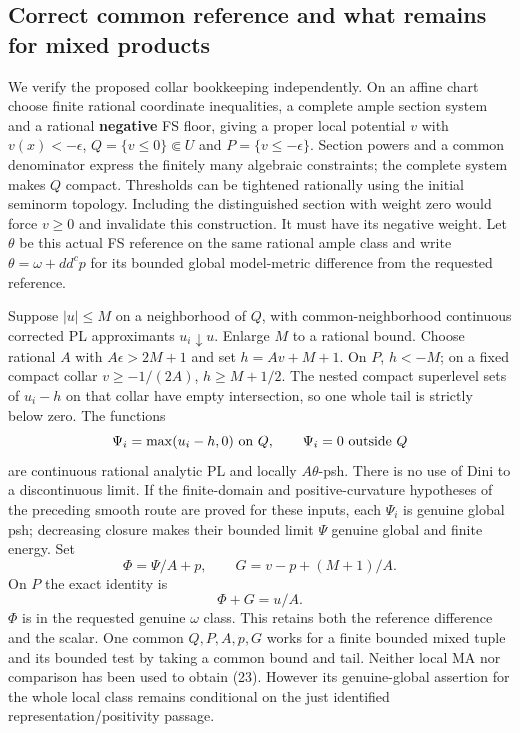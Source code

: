 \documentclass[
  11pt,
]{article}
\begin{document}
\subsection{Correct common reference and what remains for mixed
products}\label{correct-common-reference-and-what-remains-for-mixed-products}

We verify the proposed collar bookkeeping independently. On an affine
chart choose finite rational coordinate inequalities, a complete ample
section system and a rational \textbf{negative} FS floor, giving a
proper local potential \(v\) with \(v(x)<-\epsilon\),
\(Q=\{v\le0\}\Subset U\) and \(P=\{v\le-\epsilon\}\). Section powers and
a common denominator express the finitely many algebraic constraints;
the complete system makes \(Q\) compact. Thresholds can be tightened
rationally using the initial seminorm topology. Including the
distinguished section with weight zero would force \(v\ge0\) and
invalidate this construction. It must have its negative weight. Let
\(\theta\) be this actual FS reference on the same rational ample class
and write \(\theta=\omega+dd^cp\) for its bounded global model-metric
difference from the requested reference.

Suppose \(|u|\le M\) on a neighborhood of \(Q\), with
common-neighborhood continuous corrected PL approximants
\(u_i\downarrow u\). Enlarge \(M\) to a rational bound. Choose rational
\(A\) with \(A\epsilon>2M+1\) and set \(h=Av+M+1\). On \(P\), \(h<-M\);
on a fixed compact collar \(v\ge-1/(2A)\), \(h\ge M+1/2\). The nested
compact superlevel sets of \(u_i-h\) on that collar have empty
intersection, so one whole tail is strictly below zero. The functions
\[\Psi_i=\max(u_i-h,0)\ \hbox{on }Q,\qquad \Psi_i=0\ \hbox{outside }Q\]
are continuous rational analytic PL and locally \(A\theta\)-psh. There
is no use of Dini to a discontinuous limit. If the finite-domain and
positive-curvature hypotheses of the preceding smooth route are proved
for these inputs, each \(\Psi_i\) is genuine global psh; decreasing
closure makes their bounded limit \(\Psi\) genuine global and finite
energy. Set \[\Phi=\Psi/A+p,\qquad G=v-p+(M+1)/A.\] On \(P\) the exact
identity is
\[\Phi+G=u/A.                                                        \tag{23}\]
\(\Phi\) is in the requested genuine \(\omega\) class. This retains both
the reference difference and the scalar. One common \(Q,P,A,p,G\) works
for a finite bounded mixed tuple and its bounded test by taking a common
bound and tail. Neither local MA nor comparison has been used to obtain
(23). However its genuine-global assertion for the whole local class
remains conditional on the just identified representation/positivity
passage.
\end{document}

